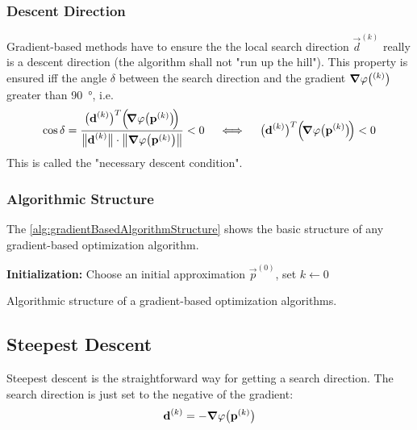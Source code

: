 			\subsubsection{Descent Direction}
				Gradient-based methods have to ensure the the local search direction \(\vec{d}^{(k)}\) really is a descent direction (the algorithm shall not "run up the hill"). This property is ensured iff the angle \( \delta \) between the search direction and the gradient \( \grad{\varphi}\big(\boldsymbol{\mathrm{}}^{(k)}\big) \) greater than \SI{90}{\degree}, i.e.
				\begin{align}
					\cos \delta = \frac{\big( \boldsymbol{\mathrm{d}}^{(k)} \big)^T \Big(\!\grad{\varphi}\big(\boldsymbol{\mathrm{p}}^{(k)}\big) \!\Big)}{\big\lVert \boldsymbol{\mathrm{d}}^{(k)} \big\rVert \cdot \big\lVert \grad{\varphi}\big(\boldsymbol{\mathrm{p}}^{(k)}\big) \big\rVert} < 0 \quad\iff\quad \big( \boldsymbol{\mathrm{d}}^{(k)} \big)^T \Big(\! \grad{\varphi}\big(\boldsymbol{\mathrm{p}}^{(k)}\big) \!\Big) < 0  \label{eq:descentDirection}
				\end{align}
				This is called the "necessary descent condition".

			\subsubsection{Algorithmic Structure}
				The \autoref{alg:gradientBasedAlgorithmStructure} shows the basic structure of any gradient-based optimization algorithm.
			
				\begin{algorithm}  \DontPrintSemicolon
					\textbf{Initialization:} Choose an initial approximation \(\vec{p}^{(0)}\), set \( k \gets 0 \) \;
				
					\caption{Algorithmic structure of a gradient-based optimization algorithms.}
					\label{alg:gradientBasedAlgorithmStructure}
				\end{algorithm}

		\subsection{Steepest Descent}
			Steepest descent is the straightforward way for getting a search direction. The search direction is just set to the negative of the gradient:
			\begin{align*}
				\boldsymbol{\mathrm{d}}^{(k)} = -\grad{\varphi}\big(\boldsymbol{\mathrm{p}}^{(k)}\big)
			\end{align*}
			
